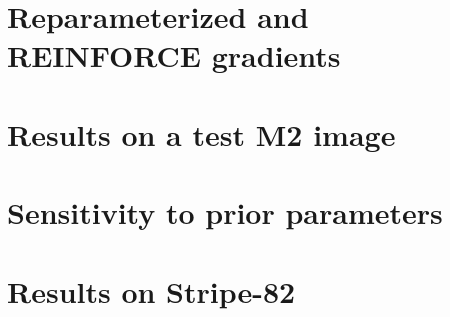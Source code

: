 \documentclass[12pt]{article}
\begin{document}
\section{Reparameterized and REINFORCE gradients}
\label{sec:reparam_details}


\section{Results on a test M2 image}
\label{sec:test_m2}



\section{Sensitivity to prior parameters}
\label{sec:prior_sensitivity}



\section{Results on Stripe-82}
\label{sec:results_sparse_field}

\end{document}
